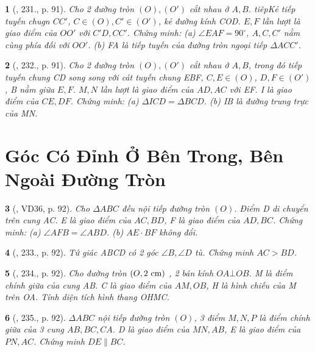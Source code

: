 \documentclass{article}
\newtheorem{baitoan}{}
\begin{document}
\begin{baitoan}[\cite{Binh_Toan_9_tap_2}, 231., p. 91]
	Cho 2 đường tròn $(O),(O')$ cắt nhau ở $A,B$. tiêpKẻ tiếp tuyến chugn $CC'$, $C\in(O),C'\in(O')$, kẻ đường kính COD. $E,F$ lần lượt là giao điểm của $OO'$ với $C'D,CC'$. Chứng minh: (a) $\angle{EAF} = 90^\circ$, $A,C,C'$ nằm cùng phía đối với $OO'$. (b) FA là tiếp tuyến của đường tròn ngoại tiếp $\Delta ACC'$.
\end{baitoan}

\begin{baitoan}[\cite{Binh_Toan_9_tap_2}, 232., p. 91]
	Cho 2 đường tròn $(O),(O')$ cắt nhau ở $A,B$, trong đó tiếp tuyến chung CD song song với cát tuyến chung EBF, $C,E\in(O)$, $D,F\in(O')$, B nằm giữa $E,F$. $M,N$ lần lượt là giao điểm của $AD,AC$ với EF. I là giao điểm của $CE,DF$. Chứng minh: (a) $\Delta ICD = \Delta BCD$. (b) IB là đường trung trực của MN.
\end{baitoan}


\section{Góc Có Đỉnh Ở Bên Trong, Bên Ngoài Đường Tròn}

\begin{baitoan}[\cite{Binh_Toan_9_tap_2}, VD36, p. 92]
	Cho $\Delta ABC$ đều nội tiếp đường tròn $(O)$. Điểm D di chuyển trên cung AC. E là giao điểm của $AC,BD$, F là giao điểm của $AD,BC$. Chứng minh: (a) $\angle{AFB} = \angle{ABD}$. (b) $AE\cdot BF$ không đổi.
\end{baitoan}

\begin{baitoan}[\cite{Binh_Toan_9_tap_2}, 233., p. 92]
	Tứ giác ABCD có 2 góc $\angle{B},\angle{D}$ tù. Chứng minh $AC > BD$.
\end{baitoan}

\begin{baitoan}[\cite{Binh_Toan_9_tap_2}, 234., p. 92]
	Cho đường tròn $(O,2\ {\rm cm})$ , 2 bán kính $OA\bot OB$. M là điểm chính giữa của cung AB. C là giao điểm của $AM,OB$, H là hình chiếu của M trên OA. Tính diện tích hình thang OHMC.
\end{baitoan}

\begin{baitoan}[\cite{Binh_Toan_9_tap_2}, 235., p. 92]
	$\Delta ABC$ nội tiếp đường tròn $(O)$, 3 điểm $M,N,P$ là điểm chính giữa của 3 cung $AB,BC,CA$. D là giao điểm của $MN,AB$, E là giao điểm của $PN,AC$. Chứng minh $DE\parallel BC$.
\end{baitoan}
\end{document}
